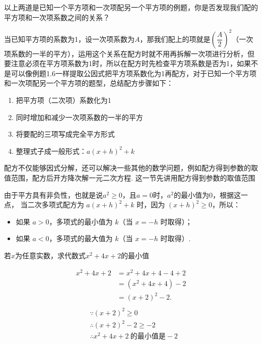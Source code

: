\documentclass[lang=cn, 10pt, titlestyle=hang, oneside]{elegantbook}
\begin{document}
以上两道是已知一个平方项和一次项配另一个平方项的例题，你是否发现我们配的平方项和一次项系数之间的关系？
\par
当已知平方项的系数为1，设一次项系数为\(A\)，那我们配上的项就是\((\dfrac{A}{2})^2\)（一次项系数的一半的平方），运用这个关系在配方时就不用再拆解一次项进行分析，但要注意必须在平方项系数为1时，所以在配方时先检查平方项系数是否为1，如果不是可以像例题1.6一样提取公因式把平方项系数化为1再配方，对于已知一个平方项和一次项配另一个平方项的题型，总结配方步骤如下：
\begin{enumerate}
    \item 把平方项（二次项）系数化为1
    \item 同时增加和减少一次项系数的一半的平方
    \item 将要配的三项写成完全平方形式
    \item 整理式子成一般形式：\( a(x + h)^2 + k \)
\end{enumerate}
\par
配方不仅能够因式分解，还可以解决一些其他的数学问题，例如配方得到参数的取值范围，配方后开方降次解一元二次方程. 这一节先讲用配方得到参数的取值范围
\par
由于平方具有非负性，也就是说\(a^2\geq0\)，且\(a=0\)时，\(a^2\)的最小值为0，根据这一点，
当二次多项式配方为 \( a(x + h)^2 + k \) 时，因为 \( (x + h)^2 \geq 0 \)，所以：
\begin{itemize}[label=]
    \item 如果 \( a > 0 \)，多项式的最小值为 \( k \)（当 \( x = -h \) 时取得）；
    \item 如果 \( a < 0 \)，多项式的最大值为 \( k \)（当 \( x = -h \) 时取得）.
\end{itemize}
\begin{example}
若\(x\)为任意实数，求代数式\(x^2+4x+2\)的最小值
\end{example}

\begin{solution}

\begin{align*}
x^2 + 4x + 2 &= x^2 + 4x + 4 - 4 + 2 \\
&= (x^2 + 4x + 4) - 2 \\
&= (x + 2)^2 - 2.\\
\end{align*}
\begin{align*}
&\because (x + 2)^2 \geq 0\\
&\therefore (x + 2)^2-2 \geq -2\\
&\therefore x^2 + 4x + 2 \  \text{的最小值是}-2
\end{align*}
\end{solution}
\end{document}
